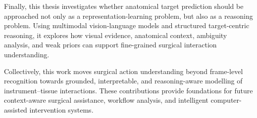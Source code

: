 Finally, this thesis investigates whether anatomical target prediction should be approached not only as a representation-learning problem, but also as a reasoning problem. Using multimodal vision-language models and structured target-centric reasoning, it explores how visual evidence, anatomical context, ambiguity analysis, and weak priors can support fine-grained surgical interaction understanding.

Collectively, this work moves surgical action understanding beyond frame-level recognition towards grounded, interpretable, and reasoning-aware modelling of instrument--tissue interactions. These contributions provide foundations for future context-aware surgical assistance, workflow analysis, and intelligent computer-assisted intervention systems.
